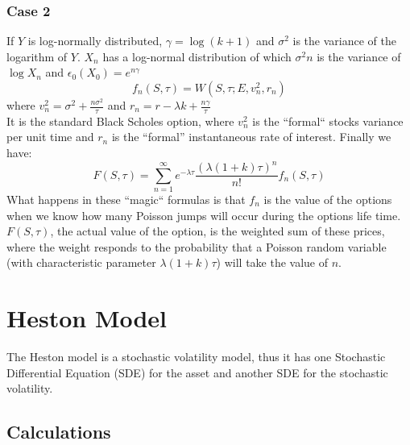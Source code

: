 \documentclass{article}
\begin{document}
\subsubsection{Case 2}
If $Y$ is log-normally distributed, $\gamma = \log (k + 1)$ and $\sigma^{2}$ is the variance of the logarithm of $Y$. $X_{n}$ has a log-normal distribution of which $\sigma^2 n$ is the variance of $\log X_{n}$ and $\epsilon_{0}(X_{0}) = e^{n\gamma}$
\begin{equation}
    f_{n}(S, \tau) = W(S, \tau; E, v_{n}^2, r_{n})
\end{equation}
where $v_{n}^2 = \sigma^2 + \frac{n\sigma^{2}}{\tau}$ and $r_{n} = r - \lambda k + \frac{n\gamma}{\tau}$ \\[2ex]
It is the standard Black Scholes option, where $v_{n}^{2}$ is the “formal“ stocks variance per unit time and $r_{n}$ is the “formal” instantaneous rate of interest. Finally we have:
\begin{equation}
    F(S, \tau) = \sum_{n=1}^{\infty} e^{-\lambda \tau} \frac{(\lambda(1+k)\tau)^{n}}{n!}f_{n}(S,\tau)
\end{equation}
What happens in these “magic“ formulas is that $f_{n}$ is the value of the options when we know how many Poisson jumps will occur during the options life time. $F(S, \tau)$, the actual value of the option, is the weighted sum of these prices, where the weight responds to the probability that a Poisson random variable (with characteristic parameter $\lambda(1+k)\tau$) will take the value of $n$.
\section{Heston Model}
The Heston model \cite{Heston_1993} is a stochastic volatility model, thus it has one Stochastic Differential Equation (SDE) for the asset and another SDE for the stochastic volatility.
\subsection{Calculations}
\end{document}
